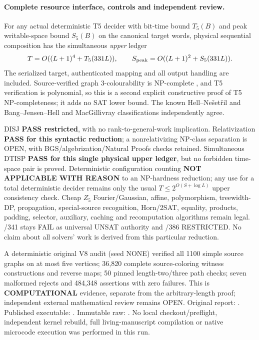 \documentclass[11pt]{article}
\begin{document}
\paragraph{Complete resource interface, controls and independent review.}
For any actual deterministic T5 decider with bit-time bound
$T_5(B)$ and peak writable-space bound $S_5(B)$ on the
canonical target words, physical sequential composition
has the simultaneous \emph{upper} ledger
\[
 T=O((L+1)^4+T_5(331L)),\qquad
 S_{\rm peak}=O((L+1)^2+S_5(331L)).
\]
The serialized target, authenticated mapping and all output
handling are included. Source-verified graph 3-colourability
is NP-complete \cite{garey1976}, and T5 verification is
polynomial, so this is a second explicit constructive proof
of T5 NP-completeness; it adds no SAT lower bound.
The known Hell--Ne\v{s}et\v{r}il and Bang--Jensen--Hell
and MacGillivray classifications independently agree.

DISJ \textbf{PASS restricted}, with no rank-to-general-work
implication. Relativization \textbf{PASS for this syntactic
reduction}; a nonrelativizing NP-class separation is OPEN,
with BGS/algebrization/Natural Proofs checks retained.
Simultaneous DTISP \textbf{PASS for this single physical
upper ledger}, but no forbidden time-space pair is proved.
Deterministic configuration counting \textbf{NOT APPLICABLE
WITH REASON} to an NP-hardness reduction; any use for a
total deterministic decider remains only the usual
$T\le2^{O(S+\log L)}$ upper consistency check.
Cheap $Z_5$ Fourier/Gaussian, affine, polymorphism,
treewidth-DP, propagation, special-source recognition,
Horn/2SAT, equality, products, padding, selector,
auxiliary, caching and recomputation algorithms remain
legal. /341 stays FAIL as universal UNSAT authority
and /386 RESTRICTED. No claim about all solvers' work
is derived from this particular reduction.

A deterministic original V8 audit (seed NONE) verified
all 1100 simple source graphs on at most five vertices;
36,820 complete source-coloring witness constructions and
reverse maps; 50 pinned length-two/three path checks;
seven malformed rejects and 484,348 assertions with zero
failures. This is \textbf{COMPUTATIONAL} evidence, separate
from the arbitrary-length proof; independent external
mathematical review remains OPEN. Original report:
.
Published executable:
.
Immutable raw:
.
No local checkout/preflight, independent kernel rebuild,
full living-manuscript compilation or native microcode
execution was performed in this run.
\end{document}
